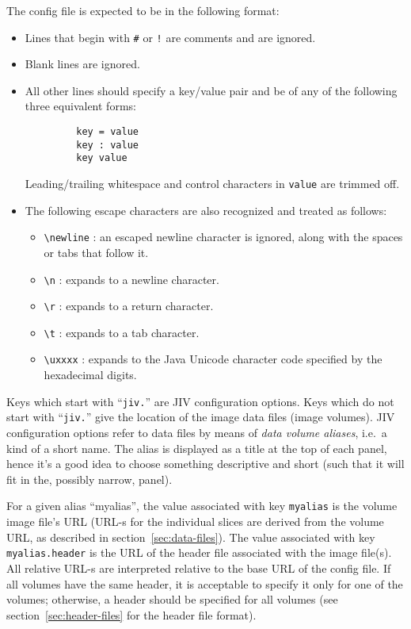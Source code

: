 The config file is expected to be in the following format:
\begin{itemize}
\item Lines that begin with \verb|#| or \verb|!| are comments and are
  ignored. 
\item Blank lines are ignored.
\item All other lines should specify a key/value pair and be of any of
  the following three equivalent forms:
\begin{verbatim}
         key = value
         key : value
         key value
\end{verbatim}
  Leading/trailing whitespace and control characters in \verb|value|
  are trimmed off.
\item The following escape characters are also recognized and
  treated as follows: 
  \begin{itemize}
  \item \verb|\newline| : 
    an escaped newline character is ignored, along with the spaces or
    tabs that follow it. 
  \item \verb|\n| : expands to a newline character.
  \item \verb|\r| : expands to a return character.
  \item \verb|\t| : expands to a tab character.
  \item \verb|\uxxxx| : expands to the Java Unicode character code
    specified by the hexadecimal digits.  
  \end{itemize}
\end{itemize} 

Keys which start with ``\verb+jiv.+'' are JIV configuration options.
Keys which do not start with ``\verb+jiv.+'' give the location of the
image data files (image volumes). JIV configuration options refer to
data files by means of {\em data volume aliases}, i.e.\ a kind of a
short name.  The alias is displayed as a title at the top of each
panel, hence it's a good idea to choose something descriptive and
short (such that it will fit in the, possibly narrow, panel).

For a given alias ``myalias'', the value associated with key
\verb+myalias+ is the volume image file's URL (URL-s for the
individual slices are derived from the volume URL, as described in
section~\ref{sec:data-files}). The value associated with key
\verb+myalias.header+ is the URL of the header file associated with
the image file(s). All relative URL-s are interpreted relative to the
base URL of the config file.  If all volumes have the same header, it
is acceptable to specify it only for one of the volumes; otherwise, a
header should be specified for all volumes (see
section~\ref{sec:header-files} for the header file format).

